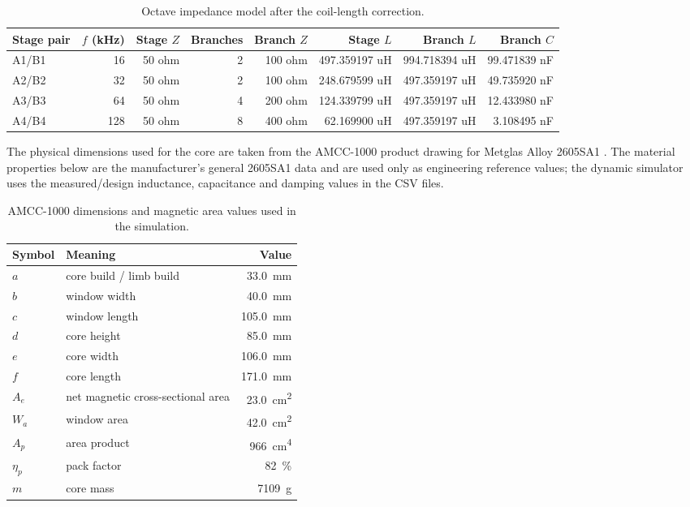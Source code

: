 \begin{table}[H]
\centering
\caption{Octave impedance model after the coil-length correction.}
\label{tab:updated-stage-impedance}
\small
\begin{tabular}{lrrrrrrr}
\toprule
Stage pair & \(f\) (kHz) & Stage \(Z\) & Branches & Branch \(Z\) & Stage \(L\) & Branch \(L\) & Branch \(C\) \\
\midrule
A1/B1 & 16 & 50 ohm & 2 & 100 ohm & 497.359197 uH & 994.718394 uH & 99.471839 nF \\
A2/B2 & 32 & 50 ohm & 2 & 100 ohm & 248.679599 uH & 497.359197 uH & 49.735920 nF \\
A3/B3 & 64 & 50 ohm & 4 & 200 ohm & 124.339799 uH & 497.359197 uH & 12.433980 nF \\
A4/B4 & 128 & 50 ohm & 8 & 400 ohm & 62.169900 uH & 497.359197 uH & 3.108495 nF \\
\bottomrule
\end{tabular}
\end{table}

The physical dimensions used for the core are taken from the AMCC-1000 product
drawing for Metglas Alloy 2605SA1 \cite{metglas2605sa1}. The material
properties below are the manufacturer's general 2605SA1 data and are used only
as engineering reference values; the dynamic simulator uses the
measured/design inductance, capacitance and damping values in the CSV files.

\begin{table}[H]
\centering
\caption{AMCC-1000 dimensions and magnetic area values used in the simulation.}
\label{tab:amcc1000-dimensions}
\begin{tabular}{llr}
\toprule
Symbol & Meaning & Value \\
\midrule
\(a\) & core build / limb build & \SI{33.0}{\milli\metre} \\
\(b\) & window width & \SI{40.0}{\milli\metre} \\
\(c\) & window length & \SI{105.0}{\milli\metre} \\
\(d\) & core height & \SI{85.0}{\milli\metre} \\
\(e\) & core width & \SI{106.0}{\milli\metre} \\
\(f\) & core length & \SI{171.0}{\milli\metre} \\
\(A_e\) & net magnetic cross-sectional area & \SI{23.0}{\centi\metre\squared} \\
\(W_a\) & window area & \SI{42.0}{\centi\metre\squared} \\
\(A_p\) & area product & \SI{966}{\centi\metre\tothe{4}} \\
\(\eta_p\) & pack factor & \SI{82}{\percent} \\
\(m\) & core mass & \SI{7109}{\gram} \\
\bottomrule
\end{tabular}
\end{table}

